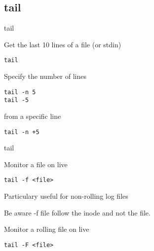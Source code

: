 \subsection{tail}

\begin{frame}[fragile]{tail}
  \begin{exampleblock}{Get the last 10 lines of a file (or stdin)}
    \begin{lstlisting}[showstringspaces=false,basicstyle=\tiny]
tail
    \end{lstlisting}
  \end{exampleblock}

  \pause
  \begin{exampleblock}{Specify the number of lines}
    \begin{lstlisting}[showstringspaces=false,basicstyle=\tiny]
tail -n 5
tail -5
    \end{lstlisting}
  \end{exampleblock}

  \pause
  \begin{exampleblock}{from a specific line}
    \begin{lstlisting}[showstringspaces=false,basicstyle=\tiny]
tail -n +5
    \end{lstlisting}
  \end{exampleblock}
\end{frame}


\begin{frame}[fragile]{tail}
  \begin{exampleblock}{Monitor a file on live}
    \begin{lstlisting}[showstringspaces=false,basicstyle=\tiny]
tail -f <file>
    \end{lstlisting}
  \end{exampleblock}
Particulary useful for non-rolling log files
\pause

Be aware -f file follow the inode and not the file.

  \pause
  \begin{exampleblock}{Monitor a rolling file on live}
    \begin{lstlisting}[showstringspaces=false,basicstyle=\tiny]
tail -F <file>
    \end{lstlisting}
  \end{exampleblock}


\end{frame}

